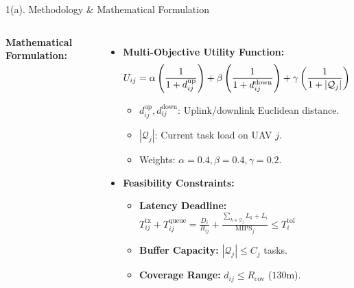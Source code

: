 \documentclass[aspectratio=169, 11pt]{beamer}
\begin{document}
\begin{frame}{1(a). Methodology \& Mathematical Formulation}
\begin{columns}[T]
        \textbf{Mathematical Formulation:}
        \begin{itemize}\setlength{\itemsep}{2pt}\footnotesize
            \item \textbf{Multi-Objective Utility Function:}
            \vspace{-1.5mm}
            \begin{equation*}
                \small
                U_{ij} = \alpha \left(\frac{1}{1 + d_{ij}^{\text{up}}}\right) + \beta \left(\frac{1}{1 + d_{ij}^{\text{down}}}\right) + \gamma \left(\frac{1}{1 + |\mathcal{Q}_j|}\right)
            \end{equation*}
            \vspace{-2mm}
            \begin{itemize}\scriptsize
                \item $d_{ij}^{\text{up}}, d_{ij}^{\text{down}}$: Uplink/downlink Euclidean distance.
                \item $|\mathcal{Q}_j|$: Current task load on UAV $j$.
                \item Weights: $\alpha=0.4, \beta=0.4, \gamma=0.2$.
            \end{itemize}
            \item \textbf{Feasibility Constraints:}
            \begin{itemize}\scriptsize
                \item \textbf{Latency Deadline:} 
                $T_{ij}^{\text{tx}} + T_{ij}^{\text{queue}} = \frac{D_i}{R_{ij}} + \frac{\sum_{k \in \mathcal{Q}_j} L_k + L_i}{\text{MIPS}_j} \le T_i^{\text{tol}}$
                \item \textbf{Buffer Capacity:} $|\mathcal{Q}_j| \le C_j$ tasks.
                \item \textbf{Coverage Range:} $d_{ij} \le R_{\text{cov}}$ ($130$m).
            \end{itemize}
        \end{itemize}
    \end{columns}
\end{frame}
\end{document}
